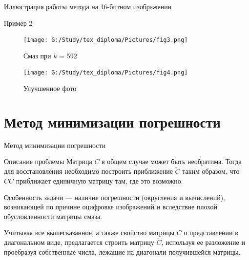\documentclass[10pt]{beamer}
\begin{document}
\begin{frame}{Иллюстрация работы метода на 16-битном изображении}
\begin{block}{Пример 2}
\begin{minipage}{50mm}
    \begin{figure}[H]
            \texttt{[image: G:/Study/tex\_diploma/Pictures/fig3.png]}
            \label{Fig3}
            \caption[Смаз при $k$ = 592]{Смаз при $k$ = 592}
        \end{figure}
\end{minipage}
\hspace{5mm}
\begin{minipage}{50mm}
  \begin{figure}[H]
            \texttt{[image: G:/Study/tex\_diploma/Pictures/fig4.png]}
            \label{Fig4}
            \caption[Улучшенное фото]{Улучшенное фото}
        \end{figure}
\end{minipage}
\hfill
\end{block}

\end{frame}



\section[Метод минимизации]{Метод минимизации погрешности}
\begin{frame}{Метод минимизации погрешности}
\begin{block}{Описание проблемы}
Матрица $C$ в общем случае может быть необратима. Тогда для восстановления необходимо построить приближение $\tilde{C}$ таким образом, что $C\tilde{C}$ приближает единичную матрицу там, где это возможно.


Особенность задачи --- наличие погрешности (округления и вычислений), возникающей по причине оцифровке изображений и вследствие плохой обусловленности матрицы смаза.
\end{block}

\begin{block}{}
Учитывая все вышесказанное, а также свойство матрицы $C$ о представлении в диагональном виде, предлагается строить матрицу $\tilde{C}$, используя ее разложение и проебразуя собственные числа, лежащие на диагонали получившейся матрицы.
\end{block}

\end{frame}
\end{document}
